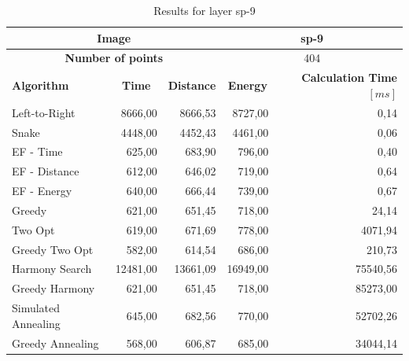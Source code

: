 \documentclass[titlepage]{article}
\begin{document}
\begin{table}[H]
	\begin{center}
		\begin{tabular}{|m{4cm}||r|r|r|r|}
			\hline
			
			\multicolumn{3}{|c|}{ 			\cellcolor[gray]{0.7} \textbf{Image}} & \multicolumn{2}{|c|}{sp-9} \\ \hline
			\multicolumn{3}{|c|}{ \cellcolor[gray]{0.7} \textbf{Number of points}} & \multicolumn{2}{|c|}{404} \\ \hline \hline
			
			\rowcolor{gray!30}
			
			\textbf{Algorithm} & \multicolumn{1}{|c|}{\textbf{Time}} & \multicolumn{1}{|c|}{\textbf{Distance}} & \multicolumn{1}{|c|}{\textbf{Energy}} & \multicolumn{1}{|p{2.5cm}|}{\textbf{Calculation Time $[ms]$}} \\ \hline
			
			Left-to-Right	 & 8666,00	& 8666,53	& 8727,00	& 0,14
			  \\ \cline{2-5}
			
			Snake & 4448,00	& 4452,43	& 4461,00& 	0,06
			  \\ \cline{2-5}
			
			EF - Time & 625,00	& 683,90& 	796,00&	0,40
			  \\ \cline{2-5}
			
			EF - Distance & 612,00	&  646,02	& 719,00	& 0,64
			  \\ \cline{2-5}
			
			EF - Energy & 640,00	& 666,44	& 739,00	& 0,67
			  \\ \cline{2-5}
			
			Greedy & 621,00	& 651,45	& 718,00	& 24,14
			  \\ \cline{2-5}
			
			Two Opt & 619,00	& 671,69	& 778,00	& 4071,94
			  \\ \cline{2-5}
			
			Greedy Two Opt & 582,00	& 614,54& 	686,00	& 210,73
			  \\ \cline{2-5}
			
			Harmony Search & 12481,00	& 13661,09& 	16949,00	& 75540,56
			  \\ \cline{2-5}
			
			Greedy Harmony & 621,00	& 651,45	& 718,00	& 85273,00
			  \\ \cline{2-5}
			
			Simulated Annealing & 645,00	& 682,56& 	770,00	& 52702,26
			  \\ \cline{2-5}
			
			Greedy Annealing & \cellcolor{yellow!80} 568,00	& \cellcolor{yellow!80}606,87	& \cellcolor{yellow!80}685,00	& 34044,14
			  \\ \hline
			
		\end{tabular}
		\caption{Results for layer sp-9}
		\label{tab:results-sp-9}
	\end{center}
\end{table}
\end{document}
